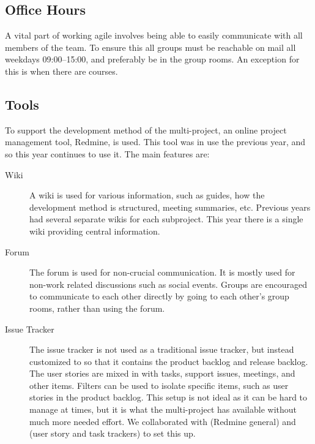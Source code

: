 \subsection{Office Hours}
A vital part of working agile involves being able to easily communicate with all members of the team. To ensure this all groups must be reachable on mail all weekdays 09:00--15:00, and preferably be in the group rooms. An exception for this is when there are courses.

\subsection{Tools}\label{sec:tools}
To support the development method of the multi-project, an online project management tool, Redmine, is used. This tool was in use the previous year, and so this year continues to use it. The main features are:

\begin{description}
  \item[Wiki] A wiki is used for various information, such as guides, how the development method is structured, meeting summaries, etc. Previous years had several separate wikis for each subproject. This year there is a single wiki providing central information.
  \item[Forum] The forum is used for non-crucial communication. It is mostly used for non-work related discussions such as social events. Groups are encouraged to communicate to each other directly by going to each other's group rooms, rather than using the forum.
  \item[Issue Tracker] The issue tracker is not used as a traditional issue tracker, but instead customized to so that it contains the product backlog and release backlog. The user stories are mixed in with tasks, support issues, meetings, and other items. Filters can be used to isolate specific items, such as user stories in the product backlog. This setup is not ideal as it can be hard to manage at times, but it is what the multi-project has available without much more needed effort. We collaborated with  (Redmine general) and  (user story and task trackers) to set this up.
\end{description}

